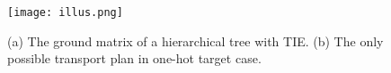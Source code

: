 \documentclass{article}
\theoremstyle{plain}%
\begin{document}

 



\begin{figure}[t]
\centering
\texttt{[image: illus.png]} 
\caption{(a) The ground matrix of a hierarchical tree with TIE. (b) The only possible transport plan in one-hot target case.} 
\label{fig:3}
\end{figure}



 

\end{document}
